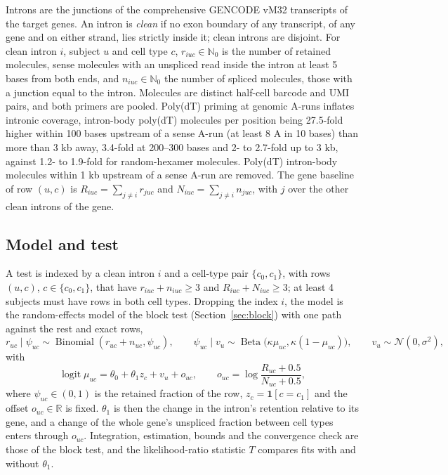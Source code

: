 \documentclass[11pt]{article}
\newcommand{\logit}{\operatorname{logit}}
\newcommand{\BetaDist}{\operatorname{Beta}}
\begin{document}
Introns are the junctions of the comprehensive GENCODE vM32 transcripts of the target genes. An intron is \emph{clean} if no exon boundary of any transcript, of any gene and on either strand, lies strictly inside it; clean introns are disjoint. For clean intron $i$, subject $u$ and cell type $c$, $r_{iuc}\in\mathbb N_0$ is the number of retained molecules, sense molecules with an unspliced read inside the intron at least 5 bases from both ends, and $n_{iuc}\in\mathbb N_0$ the number of spliced molecules, those with a junction equal to the intron. Molecules are distinct half-cell barcode and UMI pairs, and both primers are pooled. Poly(dT) priming at genomic A-runs inflates intronic coverage, intron-body poly(dT) molecules per position being 27.5-fold higher within 100 bases upstream of a sense A-run (at least 8 A in 10 bases) than more than 3 kb away, 3.4-fold at 200--300 bases and 2- to 2.7-fold up to 3 kb, against 1.2- to 1.9-fold for random-hexamer molecules. Poly(dT) intron-body molecules within 1 kb upstream of a sense A-run are removed. The gene baseline of row $(u,c)$ is $R_{iuc}=\sum_{j\neq i}r_{juc}$ and $N_{iuc}=\sum_{j\neq i}n_{juc}$, with $j$ over the other clean introns of the gene.

\subsection{Model and test}

A test is indexed by a clean intron $i$ and a cell-type pair $\{c_0,c_1\}$, with rows $(u,c)$, $c\in\{c_0,c_1\}$, that have $r_{iuc}+n_{iuc}\ge3$ and $R_{iuc}+N_{iuc}\ge3$; at least 4 subjects must have rows in both cell types. Dropping the index $i$, the model is the random-effects model of the block test (Section~\ref{sec:block}) with one path against the rest and exact rows, \[r_{uc}\mid\psi_{uc}\sim\operatorname{Binomial}(r_{uc}+n_{uc},\psi_{uc}),\qquad \psi_{uc}\mid v_u\sim\BetaDist\big(\kappa\mu_{uc},\kappa(1-\mu_{uc})\big),\qquad v_u\sim\mathcal N(0,\sigma^2),\] with \[\logit\mu_{uc}=\theta_0+\theta_1z_c+v_u+o_{uc},\qquad o_{uc}=\log\frac{R_{uc}+0.5}{N_{uc}+0.5},\] where $\psi_{uc}\in(0,1)$ is the retained fraction of the row, $z_c=\mathbf 1[c=c_1]$ and the offset $o_{uc}\in\mathbb R$ is fixed. $\theta_1$ is then the change in the intron's retention relative to its gene, and a change of the whole gene's unspliced fraction between cell types enters through $o_{uc}$. Integration, estimation, bounds and the convergence check are those of the block test, and the likelihood-ratio statistic $T$ compares fits with and without $\theta_1$.
\end{document}
